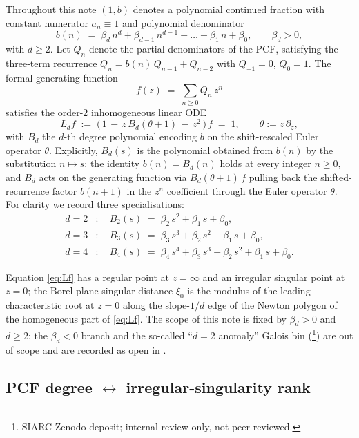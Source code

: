 \documentclass[11pt,reqno]{amsart}
\theoremstyle{plain}
\theoremstyle{definition}
\theoremstyle{remark}
\begin{document}
Throughout this note $(1, b)$ denotes a polynomial continued
fraction with constant numerator $a_n \equiv 1$ and
polynomial denominator
\begin{equation}
\label{eq:b-poly}
  b(n) \;=\; \beta_d\,n^d + \beta_{d-1}\,n^{d-1} + \dots
              + \beta_1\,n + \beta_0,
  \qquad \beta_d > 0,
\end{equation}
with $d \ge 2$. Let $Q_n$ denote the partial denominators
of the PCF, satisfying the three-term recurrence
$Q_n = b(n)\,Q_{n-1} + Q_{n-2}$ with $Q_{-1} = 0$,
$Q_0 = 1$. The formal generating function
\[
  f(z) \;=\; \sum_{n\ge 0} Q_n\,z^n
\]
satisfies the order-$2$ inhomogeneous linear ODE
\begin{equation}
\label{eq:Lf}
  L_d f \;:=\;
   \bigl(\,1 \,-\, z\,B_d(\theta + 1)
            \,-\, z^2\,\bigr)\,f \;=\; 1,
  \qquad \theta := z\,\partial_z,
\end{equation}
with $B_d$ the $d$-th degree polynomial encoding $b$ on the
shift-rescaled Euler operator $\theta$. Explicitly,
$B_d(s)$ is the polynomial obtained from $b(n)$ by the
substitution $n \mapsto s$: the identity $b(n) = B_d(n)$
holds at every integer $n \ge 0$, and $B_d$ acts on the
generating function via $B_d(\theta+1)\,f$ pulling back the
shifted-recurrence factor $b(n+1)$ in the $z^n$ coefficient
through the Euler operator $\theta$. For clarity we record
three specialisations:
\begin{align*}
  d = 2 &: \quad B_2(s) \;=\; \beta_2\,s^2 + \beta_1\,s + \beta_0, \\
  d = 3 &: \quad B_3(s) \;=\; \beta_3\,s^3 + \beta_2\,s^2 + \beta_1\,s + \beta_0, \\
  d = 4 &: \quad B_4(s) \;=\; \beta_4\,s^4 + \beta_3\,s^3 + \beta_2\,s^2 + \beta_1\,s + \beta_0.
\end{align*}

Equation \eqref{eq:Lf} has a regular point at $z = \infty$
and an irregular singular point at $z = 0$; the
Borel-plane singular distance $\xi_0$ is the modulus of the
leading characteristic root at $z = 0$ along the
slope-$1/d$ edge of the Newton polygon of the homogeneous
part of \eqref{eq:Lf}. The scope of this note is fixed by
$\beta_d > 0$ and $d \ge 2$; the $\beta_d < 0$ branch and
the so-called ``$d = 2$ anomaly'' Galois bin
(\cite[Remark~5.E]{siarc_pcf1_v13}\footnote{SIARC Zenodo
deposit; internal review only, not peer-reviewed.}) are out
of scope and are recorded as open in .

\subsection{PCF degree $\leftrightarrow$ irregular-singularity rank}
\label{ssec:dq-mapping}
\end{document}
